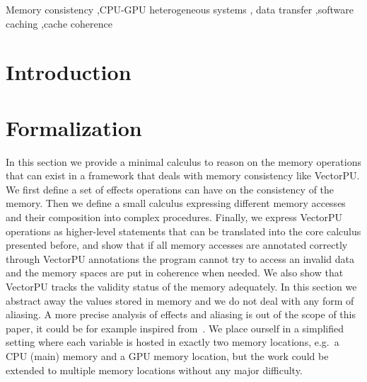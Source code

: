 \documentclass[preprint,12pt]{elsarticle}
\begin{document}
\begin{frontmatter}
\begin{abstract}
\end{abstract}

\begin{keyword}
Memory consistency \sep CPU-GPU heterogeneous systems \sep  
data transfer \sep  software caching \sep  cache coherence 


\end{keyword}

\end{frontmatter}

\section{Introduction}



\section{Formalization}\label{sec:Formal}

In this section we provide a minimal calculus to reason on the memory operations that can 
exist in a framework that deals with memory consistency like VectorPU. We first define a 
set of effects operations can have on the consistency of the memory. Then we define a 
small calculus expressing different memory accesses and their composition into complex 
procedures. Finally, we express VectorPU operations as higher-level statements that can 
be translated  into the core calculus presented before, and show that if all memory 
accesses are annotated correctly through VectorPU annotations the program cannot try to 
access an invalid data and the memory spaces are put in coherence when needed. We also 
show that VectorPU tracks the validity status of the memory adequately. In this 
section we abstract away the values stored in memory and we 
do not deal with any form of aliasing. A more precise analysis of effects and aliasing is 
out of the scope of this paper, it could be for example inspired 
from~\cite{Nielson1999}.
We place ourself in a simplified setting where each variable is hosted in exactly two 
memory locations, e.g.\ a CPU (main) memory and a GPU memory location, but the work could be extended to multiple memory 
locations without any major difficulty.
\end{document}
